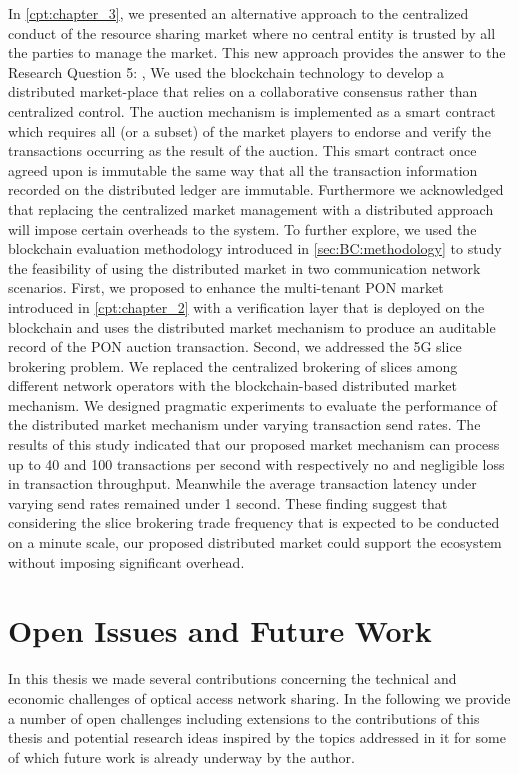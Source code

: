 In \autoref{cpt:chapter_3}, we presented an alternative approach to the centralized conduct of the resource sharing market where no central entity is trusted by all the parties to manage the market. This new approach provides the answer to the Research Question 5: \textit{\RQe}, We used the blockchain technology to develop a distributed market-place that relies on a collaborative consensus rather than centralized control. The auction mechanism is implemented as a smart contract which requires all (or a subset) of the market players to endorse and verify the transactions occurring as the result of the auction. This smart contract once agreed upon is immutable the same way that all the transaction information recorded on the distributed ledger are immutable. Furthermore we acknowledged that replacing the centralized market management with a distributed approach will impose certain overheads to the system. To further explore, we used the blockchain evaluation methodology introduced in \autoref{sec:BC:methodology} to study the feasibility of using the distributed market in two communication network scenarios. First, we proposed to enhance the multi-tenant \ac{PON} market introduced in \autoref{cpt:chapter_2} with a verification layer that is deployed on the blockchain and uses the distributed market mechanism to produce an auditable record of the \ac{PON} auction transaction. Second, we addressed the 5G slice brokering problem. We replaced the centralized brokering of slices among different network operators with the blockchain-based distributed market mechanism. We designed pragmatic experiments to evaluate the performance of the distributed market mechanism under varying transaction send rates. The results of this study indicated that our proposed market mechanism can process up to 40 and 100 transactions per second with respectively no and negligible loss in transaction throughput. Meanwhile the average transaction latency under varying send rates remained under 1 second. These finding suggest that considering the slice brokering trade frequency that is expected to be conducted on a minute scale, our proposed distributed market could support the ecosystem without imposing significant overhead.




\section{Open Issues and  Future Work}
In this thesis we made several contributions concerning the technical and economic challenges of optical access network sharing. In the following we provide a number of open challenges including extensions to the contributions of this thesis and potential research ideas inspired by the topics addressed in it for some of which future work is already underway by the author.




